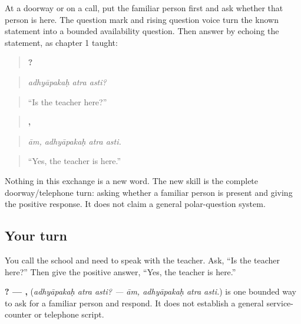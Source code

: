 \begin{grammarlens}[title={Grammar Lens: build the person request}]
At a doorway or on a call, put the familiar person first and ask whether that person is here. The question mark and rising question voice turn the known statement into a bounded availability question. Then answer by echoing the statement, as chapter 1 taught:

\begin{quote}
\textbf{  ?}
\end{quote}

\begin{quote}
\emph{adhyāpakaḥ atra asti?}
\end{quote}

\begin{quote}
“Is the teacher here?”
\end{quote}

\begin{quote}
\textbf{,   }
\end{quote}

\begin{quote}
\emph{ām, adhyāpakaḥ atra asti.}
\end{quote}

\begin{quote}
“Yes, the teacher is here.”
\end{quote}

Nothing in this exchange is a new word. The new skill is the complete doorway/telephone turn: asking whether a familiar person is present and giving the positive response. It does not claim a general polar-question system.
\end{grammarlens}

\subsection*{Your turn}
You call the school and need to speak with the teacher. Ask, “Is the teacher here?” Then give the positive answer, “Yes, the teacher is here.”

\begin{grammarlens}[title={What you've built}]
\textbf{  ? — ,   } (\emph{adhyāpakaḥ atra asti? — ām, adhyāpakaḥ atra asti.}) is one bounded way to ask for a familiar person and respond. It does not establish a general service-counter or telephone script.
\end{grammarlens}

